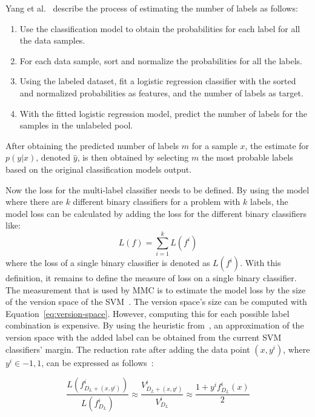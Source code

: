 Yang et al\@.~\cite{yang2009effective} describe the process of estimating the number of labels as follows:
\begin{enumerate}
    \item Use the classification model to obtain the probabilities for each label for all the data samples.
    \item For each data sample, sort and normalize the probabilities for all the labels.
    \item Using the labeled dataset, fit a logistic regression classifier with the sorted and normalized probabilities as features, and the number of labels as target.
    \item With the fitted logistic regression model, predict the number of labels for the samples in the unlabeled pool.
\end{enumerate}

After obtaining the predicted number of labels $m$ for a sample $x$, the estimate for $p(y|x)$, denoted $\hat{y}$, is then obtained by selecting $m$ the most probable labels based on the original classification models output.

Now the loss for the multi-label classifier needs to be defined.
By using the model where there are $k$ different binary classifiers for a problem with $k$ labels, the model loss can be calculated by adding the loss for the different binary classifiers like:
\begin{equation}
    L(f) = \sum_{i = 1}^k L(f^i)
\end{equation}
where the loss of a single binary classifier is denoted as $L(f^i)$.
With this definition, it remains to define the measure of loss on a single binary classifier.
The measurement that is used by MMC is to estimate the model loss by the size of the version space of the SVM~\cite{tong2001support, yang2009effective}.
The version space's size can be computed with Equation~\ref{eq:version-space}.
However, computing this for each possible label combination is expensive.
By using the heuristic from~\cite{tong2001active}, an approximation of the version space with the added label can be obtained from the current SVM classifiers' margin.
The reduction rate after adding the data point $(x, y^i)$, where $y^i \in {-1, 1}$, can be expressed as follows~\cite{yang2009effective, tong2001active}:

\begin{equation}\label{eq:reduction-rate}
    \frac{L(f^i_{D_L+(x, y^i)})}{L(f^i_{D_L})} \approx \frac{V^i_{D_L + (x, y^i)}}{V^i_{D_L}} \approx \frac{1 + y^i f^i_{D_L}(x)}{2}
\end{equation}

